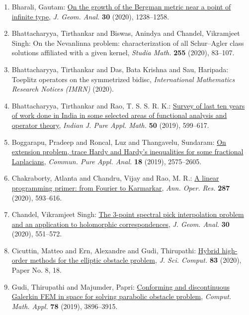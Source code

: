 \begin{enumerate}[resume, leftmargin=27pt]
	\item Bharali, Gautam: \href{https://doi.org/10.1007/s12220-019-00342-9}{On the growth of the {B}ergman metric near a point of infinite
		      type}, \emph{J. Geom. Anal.} {\bf 30} (2020), 1238--1258.

	\item Bhattacharyya, Tirthankar and Biswas, Anindya and Chandel, Vikramjeet Singh: On the Nevanlinna problem: characterization of all Schur–Agler class solutions affiliated with a given kernel, \emph{Studia Math.} {\bf 255} (2020), 83–107.

	\item\label{Bhattacharyya:symm-bidisc} Bhattacharyya, Tirthankar and Das, Bata Krishna and Sau, Haripada: Toeplitz
	      operators on the symmetrized bidisc, \emph{International Mathematics Research Notices (IMRN)} (2020).

	\item Bhattacharyya, Tirthankar and Rao, T. S. S. R. K.: \href{https://doi.org/10.1007/s13226-019-0345-4}{Survey of last ten years of work done in {I}ndia in some
		      selected areas of functional analysis and operator theory}, \emph{Indian J. Pure Appl. Math.} {\bf 50} (2019), 599--617.

	\item Boggarapu, Pradeep and Roncal, Luz and Thangavelu, Sundaram: \href{https://doi.org/10.3934/cpaa.2019116}{On extension problem, trace {H}ardy and {H}ardy's inequalities
		      for some fractional {L}aplacians}, \emph{Commun. Pure Appl. Anal.} {\bf 18} (2019), 2575--2605.

	\item Chakraborty, Atlanta and Chandru, Vijay and Rao, M. R.: \href{https://doi.org/10.1007/s10479-019-03186-2}{A linear programming primer: from {F}ourier to {K}armarkar}, \emph{Ann. Oper. Res.} {\bf 287} (2020), 593--616.

	\item Chandel, Vikramjeet Singh: \href{https://doi.org/10.1007/s12220-018-00123-w}{The 3-point spectral pick interpolation problem and an
		      application to holomorphic correspondences}, \emph{J. Geom. Anal.} {\bf 30} (2020), 551--572.

	\item Cicuttin, Matteo and Ern, Alexandre and Gudi, Thirupathi: \href{https://doi.org/10.1007/s10915-020-01195-z}{Hybrid high-order methods for the elliptic obstacle problem}, \emph{J. Sci. Comput.} {\bf 83} (2020), Paper No. 8, 18.

	\item Gudi, Thirupathi and Majumder, Papri: \href{https://doi.org/10.1016/j.camwa.2019.06.022}{Conforming and discontinuous {G}alerkin {FEM} in space for
	      solving parabolic obstacle problem}, \emph{Comput. Math. Appl.} {\bf 78} (2019), 3896--3915.


\end{enumerate}
